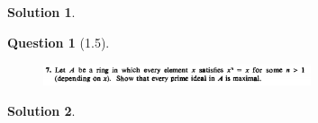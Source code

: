 \documentclass[11pt]{article}
\theoremstyle{plain}
\theoremstyle{quest}
\newtheorem*{question}{Question}
\newtheorem*{solution}{Solution}
\begin{document}
\begin{solution} \hfill \\


\end{solution}
\begin{question}[1.5]
\hfill
\begin{figure}[h!]
  \centering
    \includegraphics[width=0.7\textwidth]{d-1-7.png}
\end{figure}
\end{question}
\begin{solution} \hfill \\


\end{solution}

\newpage
\end{document}
